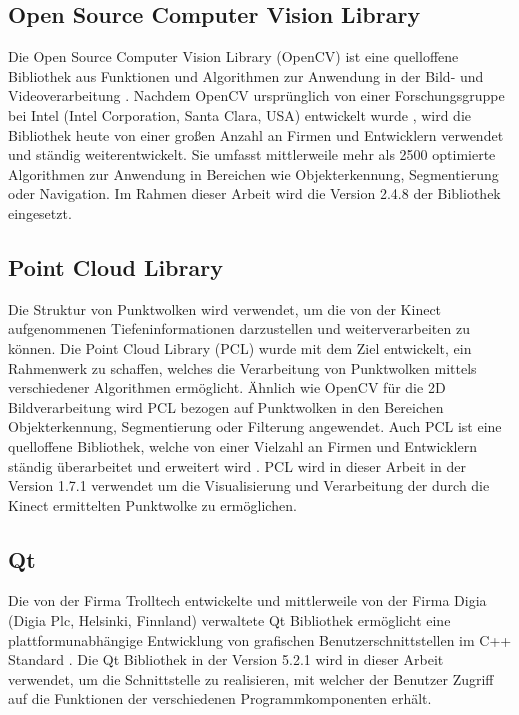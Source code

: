 \subsection{Open Source Computer Vision Library}
Die Open Source Computer Vision Library (OpenCV) ist eine quelloffene Bibliothek aus Funktionen und Algorithmen zur Anwendung in der Bild- und Videoverarbeitung \cite{OpenCV}. Nachdem OpenCV ursprünglich von einer Forschungsgruppe bei Intel (Intel Corporation, Santa Clara, USA) entwickelt wurde \cite{Laganiere2011}, wird die Bibliothek heute von einer großen Anzahl an Firmen und Entwicklern verwendet und ständig weiterentwickelt. Sie umfasst mittlerweile mehr als 2500 optimierte Algorithmen zur Anwendung in Bereichen wie Objekterkennung, Segmentierung oder Navigation. Im Rahmen dieser Arbeit wird die Version 2.4.8 der Bibliothek eingesetzt.


\subsection{Point Cloud Library}
Die Struktur von Punktwolken wird verwendet, um die von der Kinect aufgenommenen Tiefeninformationen darzustellen und weiterverarbeiten zu können. Die Point Cloud Library (PCL) wurde mit dem Ziel entwickelt, ein Rahmenwerk zu schaffen, welches die Verarbeitung von Punktwolken mittels verschiedener Algorithmen ermöglicht. Ähnlich wie OpenCV für die 2D Bildverarbeitung wird PCL bezogen auf Punktwolken in den Bereichen Objekterkennung, Segmentierung oder Filterung angewendet. Auch PCL ist eine quelloffene Bibliothek, welche von einer Vielzahl an Firmen und Entwicklern ständig überarbeitet und erweitert wird \cite{PCL}. PCL wird in dieser Arbeit in der Version 1.7.1 verwendet um die Visualisierung und Verarbeitung der durch die Kinect ermittelten Punktwolke zu ermöglichen.


\subsection{Qt}
Die von der Firma Trolltech entwickelte und mittlerweile von der Firma Digia (Digia Plc, Helsinki, Finnland) verwaltete Qt Bibliothek ermöglicht eine plattformunabhängige Entwicklung von grafischen Benutzerschnittstellen im C++ Standard \cite{Qt}. Die Qt Bibliothek in der Version 5.2.1 wird in dieser Arbeit verwendet, um die Schnittstelle zu realisieren, mit welcher der Benutzer Zugriff auf die Funktionen der verschiedenen Programmkomponenten erhält.

